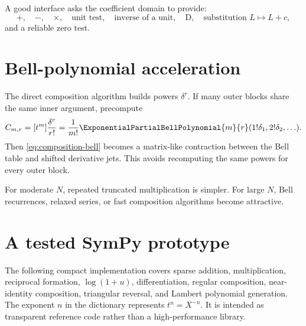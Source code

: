 \documentclass[11pt,openany]{book}
\theoremstyle{definition}
\theoremstyle{plain}
\theoremstyle{remark}
\newcommand{\Dop}{\mathrm{D}}
\begin{document}
A good interface asks the coefficient domain to provide:
\[
 +,\quad -,\quad \times,\quad \text{unit test},\quad \text{inverse of a unit},
 \quad \Dop,\quad \text{substitution }L\mapsto L+c,
\]
and a reliable zero test.

\section{Bell-polynomial acceleration}
The direct composition algorithm builds powers \(\delta^r\).  If many outer
blocks share the same inner argument, precompute
\[
 C_{m,r}=[t^m]\frac{\delta^r}{r!}
 =\frac1{m!}\ExponentialPartialBellPolynomial{m}{r}
 (1!\delta_1,2!\delta_2,\ldots).
\]
Then \cref{eq:composition-bell} becomes a matrix-like contraction between the
Bell table and shifted derivative jets.  This avoids recomputing the same
powers for every outer block.

For moderate \(N\), repeated truncated multiplication is simpler.  For large
\(N\), Bell recurrences, relaxed series, or fast composition algorithms become
attractive.

\section{A tested SymPy prototype}
The following compact implementation covers sparse addition, multiplication,
reciprocal formation, \(\log(1+u)\), differentiation, regular composition,
near-identity composition, triangular reversal, and Lambert polynomial
generation.  The exponent \(n\) in the dictionary represents
\(t^n=X^{-n}\).  It is intended as transparent reference code rather than a
high-performance library.
\end{document}
